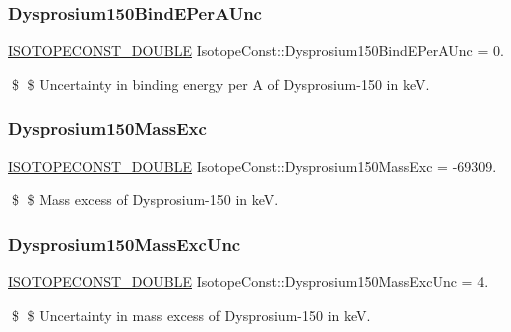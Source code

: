 \subsubsection{\texorpdfstring{Dysprosium150\+Bind\+E\+Per\+A\+Unc}{Dysprosium150BindEPerAUnc}}
{\footnotesize\ttfamily \mbox{\hyperlink{group___isotope_const-_macros_ga8f45a7272ce02c0b4c65c44636ed719a}{I\+S\+O\+T\+O\+P\+E\+C\+O\+N\+S\+T\+\_\+\+D\+O\+U\+B\+LE}} Isotope\+Const\+::\+Dysprosium150\+Bind\+E\+Per\+A\+Unc = 0.}

\$ \$ Uncertainty in binding energy per A of Dysprosium-\/150 in keV. \mbox{\label{group___isotope_const-_dysprosium-_dy150_ga066c82cd30a1179e6599e541ec29ced1}} 
\subsubsection{\texorpdfstring{Dysprosium150\+Mass\+Exc}{Dysprosium150MassExc}}
{\footnotesize\ttfamily \mbox{\hyperlink{group___isotope_const-_macros_ga8f45a7272ce02c0b4c65c44636ed719a}{I\+S\+O\+T\+O\+P\+E\+C\+O\+N\+S\+T\+\_\+\+D\+O\+U\+B\+LE}} Isotope\+Const\+::\+Dysprosium150\+Mass\+Exc = -\/69309.}

\$ \$ Mass excess of Dysprosium-\/150 in keV. \mbox{\label{group___isotope_const-_dysprosium-_dy150_ga9e96720caffc940b3541a4ebf336437b}} 
\subsubsection{\texorpdfstring{Dysprosium150\+Mass\+Exc\+Unc}{Dysprosium150MassExcUnc}}
{\footnotesize\ttfamily \mbox{\hyperlink{group___isotope_const-_macros_ga8f45a7272ce02c0b4c65c44636ed719a}{I\+S\+O\+T\+O\+P\+E\+C\+O\+N\+S\+T\+\_\+\+D\+O\+U\+B\+LE}} Isotope\+Const\+::\+Dysprosium150\+Mass\+Exc\+Unc = 4.}

\$ \$ Uncertainty in mass excess of Dysprosium-\/150 in keV. \mbox{\label{group___isotope_const-_dysprosium-_dy150_gad1cccaeb64f8ff819f60783950a1e388}} 
